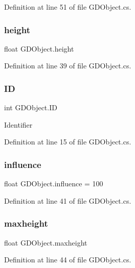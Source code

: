 Definition at line 51 of file G\+D\+Object.\+cs.

\mbox{\label{class_g_d_object_a9928057cf37d1a01fe0ad67756936b7f}} 
\subsubsection{height}
{\footnotesize\ttfamily float G\+D\+Object.\+height}



Definition at line 39 of file G\+D\+Object.\+cs.

\mbox{\label{class_g_d_object_a3679f40c54b23a2785537ccee8decd84}} 
\subsubsection{ID}
{\footnotesize\ttfamily int G\+D\+Object.\+ID}



Identifier 



Definition at line 15 of file G\+D\+Object.\+cs.

\mbox{\label{class_g_d_object_ae08e36311f162812791f47f7fa4eb726}} 
\subsubsection{influence}
{\footnotesize\ttfamily float G\+D\+Object.\+influence = 100}



Definition at line 41 of file G\+D\+Object.\+cs.

\mbox{\label{class_g_d_object_a4e1d0b4daf2de1aab1e66f927962193c}} 
\subsubsection{maxheight}
{\footnotesize\ttfamily float G\+D\+Object.\+maxheight}



Definition at line 44 of file G\+D\+Object.\+cs.

\mbox{\label{class_g_d_object_acce7bba8957f2989b735e78d5a1a1deb}} 
